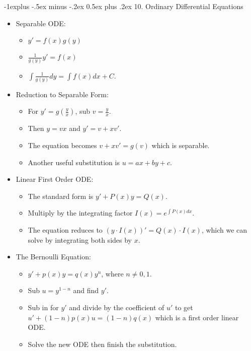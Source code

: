\documentclass[10pt, portrait]{article}
\makeatletter
\renewcommand{\section}{\@startsection{section}{1}{0mm}%
                                {-1ex plus -.5ex minus -.2ex}%
                                {0.5ex plus .2ex}%
                                {\normalfont\large\bfseries}}
\renewcommand{\section}{\@startsection{section}{2}{0mm}%
                                {-1explus -.5ex minus -.2ex}%
                                {0.5ex plus .2ex}%
                                {\normalfont\normalsize\bfseries}}
\makeatother
\begin{document}
\begin{multicols*}{2}
\section{10. Ordinary Differential Equations}
\begin{itemize}
    \item Separable ODE:
    \begin{itemize}
        \item $y'=f(x)g(y)$
        \item $\frac{1}{g(y)}y'=f(x)$
        \item $\int\frac{1}{g(y)}dy=\int f(x)dx+C$.
    \end{itemize}
    \item Reduction to Separable Form:
    \begin{itemize}
        \item For $y'=g(\frac{y}{x})$, sub $v=\frac{y}{x}$.
        \item Then $y=vx$ and $y'=v+xv'$.
        \item The equation becomes $v+xv'=g(v)$ which is separable.
        \item Another useful substitution is $u=ax+by+c$.
    \end{itemize}
    \item Linear First Order ODE:
    \begin{itemize}
        \item The standard form is $y'+P(x)y=Q(x)$.
        \item Multiply by the integrating factor $I(x)=e^{\int P(x)dx}$.
        \item The equation reduces to $(y\cdot I(x))'=Q(x)\cdot I(x)$, which we can solve by integrating both sides by $x$.
    \end{itemize}
    \item The Bernoulli Equation:
    \begin{itemize}
        \item $y'+p(x)y=q(x)y^n$, where $n\neq0,1$.
        \item Sub $u=y^{1-n}$ and find $y'$.
        \item Sub in for $y'$ and divide by the coefficient of $u'$ to get $u'+(1-n)p(x)u=(1-n)q(x)$ which is a first order linear ODE.
        \item Solve the new ODE then finish the substitution.
    \end{itemize}
\end{itemize}

\end{multicols*}
\end{document}
